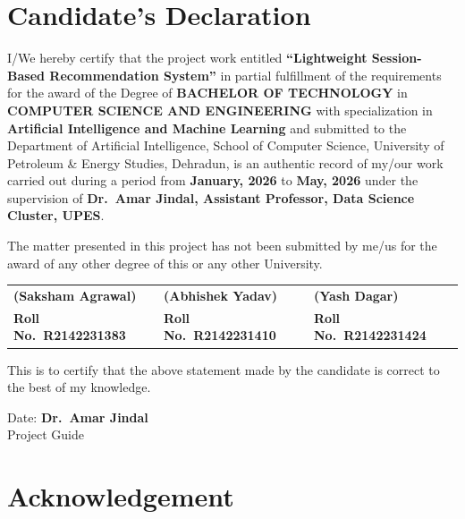 \documentclass[12pt,a4paper]{report}
\begin{document}
\chapter*{Candidate's Declaration}

I/We hereby certify that the project work entitled
\textbf{``Lightweight Session-Based Recommendation System''}
in partial fulfillment of the requirements for the award of the Degree of
\textbf{BACHELOR OF TECHNOLOGY} in
\textbf{COMPUTER SCIENCE AND ENGINEERING}
with specialization in \textbf{Artificial Intelligence and Machine Learning}
and submitted to the Department of Artificial Intelligence, School of Computer Science,
University of Petroleum \& Energy Studies, Dehradun, is an authentic record of
my/our work carried out during a period from \textbf{January, 2026} to
\textbf{May, 2026} under the supervision of
\textbf{Dr.\ Amar Jindal, Assistant Professor, Data Science Cluster, UPES}.

The matter presented in this project has not been submitted by me/us for the award
of any other degree of this or any other University.

\vspace{2cm}

\noindent
\begin{tabular}{p{4cm} p{4cm} p{4cm}}
\textbf{(Saksham Agrawal)} & \textbf{(Abhishek Yadav)} & \textbf{(Yash Dagar)} \\
\textbf{Roll No.\ R2142231383} & \textbf{Roll No.\ R2142231410} & \textbf{Roll No.\ R2142231424} \\
\end{tabular}

\vspace{1.5cm}
\noindent
This is to certify that the above statement made by the candidate is correct to the
best of my knowledge.

\vspace{1.5cm}

\noindent
Date: \underline{\hspace{3cm}} \hfill \textbf{Dr.\ Amar Jindal}\\
\hfill Project Guide

\chapter*{Acknowledgement}
\end{document}
